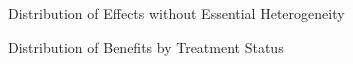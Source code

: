 \begin{frame}
	\begin{figure}\caption{Distribution of Effects without Essential Heterogeneity}
	\end{figure}
\end{frame}
\begin{frame}
	\begin{figure}\caption{Distribution of Benefits by Treatment Status}
	\end{figure}
\end{frame}